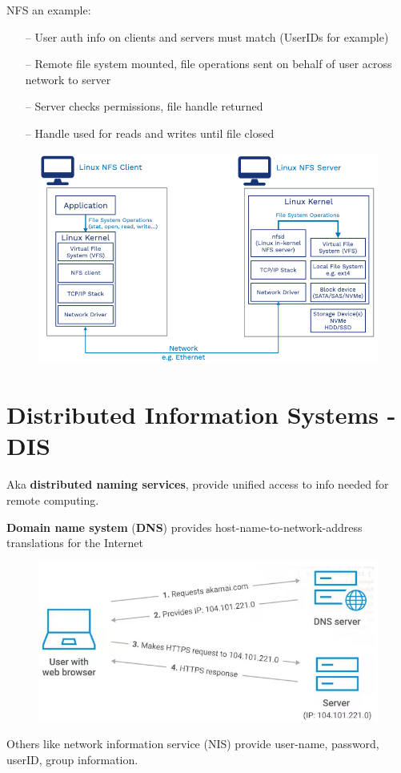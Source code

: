 NFS an example:

\begin{itemize}
    \item[--] User auth info on clients and servers must match (UserIDs for example)
    \item[--] Remote file system mounted, file operations sent on behalf of user across network to server
    \item[--] Server checks permissions, file handle returned
    \item[--] Handle used for reads and writes until file closed
\end{itemize}

\begin{figure}[h!]
    \centering
    \includegraphics[width=0.6\linewidth]{img/fdsbdfgbn.png}
\end{figure}

\section{Distributed Information Systems - DIS}

Aka \textbf{distributed naming services}, provide unified access to info needed for
remote computing.

\textbf{Domain name system} (\textbf{DNS}) provides host-name-to-network-address
translations for the Internet

\begin{figure}[h!]
    \centering
    \includegraphics[width=0.46\linewidth]{img/adzgtndrftgn.png}
\end{figure}

Others like network information service (NIS) provide user-name, password,
userID, group information.
